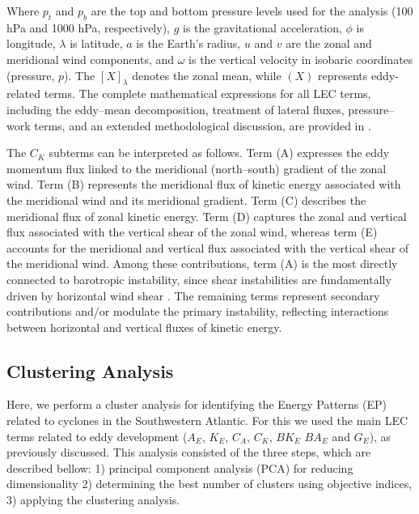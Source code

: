 \documentclass[pdflatex,sn-chicago]{sn-jnl}%
\theoremstyle{plain}
\theoremstyle{definition}
\theoremstyle{remark}
\theoremstyle{definition}
\begin{document}
Where \(p_t\) and \(p_b\) are the top and bottom pressure levels used for the analysis (100 hPa and 1000 hPa, respectively), \(g\) is the gravitational acceleration, \(\phi\) is longitude, \(\lambda\) is latitude, \(a\) is the Earth’s radius, \(u\) and \(v\) are the zonal and meridional wind components, and \(\omega\) is the vertical velocity in isobaric coordinates (pressure, \(p\)). The \([X]_{\lambda}\) denotes the zonal mean, while \((X)\) represents eddy-related terms. The complete mathematical expressions for all LEC terms, including the eddy–mean decomposition, treatment of lateral fluxes, pressure–work terms, and an extended methodological discussion, are provided in \citet{de2025lorenz}.

The $C_K$ subterms can be interpreted as follows. Term (A) expresses the eddy momentum flux linked to the meridional (north--south) gradient of the zonal wind. Term (B) represents the meridional flux of kinetic energy associated with the meridional wind and its meridional gradient. Term (C) describes the meridional flux of zonal kinetic energy. Term (D) captures the zonal and vertical flux associated with the vertical shear of the zonal wind, whereas term (E) accounts for the meridional and vertical flux associated with the vertical shear of the meridional wind. Among these contributions, term (A) is the most directly connected to barotropic instability, since shear instabilities are fundamentally driven by horizontal wind shear \citep{rayleigh1895stability,kuo1949dynamic,chen1985note,mak1989local,yokota2012tropical,read2020baroclinic}. The remaining terms represent secondary contributions and/or modulate the primary instability, reflecting interactions between horizontal and vertical fluxes of kinetic energy.

\subsection{Clustering Analysis}

Here, we perform a cluster analysis for identifying the Energy Patterns (EP) related to cyclones in the Southwestern Atlantic. For this we used the main LEC terms related to eddy development ($A_E$, $K_E$, $C_A$, $C_K$, $BK_E$ $BA_E$ and $G_E$), as previously discussed. This analysis consisted of the three steps, which are described bellow: 1) principal component analysis (PCA) for reducing dimensionality 2) determining the best number of clusters using objective indices, 3) applying the clustering analysis.
\end{document}
